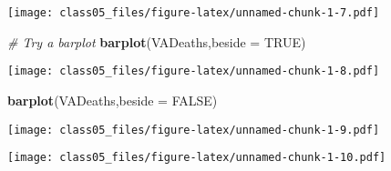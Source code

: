 \documentclass[]{article}
\newenvironment{Shaded}{\begin{snugshade}}{\end{snugshade}}
\newcommand{\KeywordTok}[1]{\textcolor[rgb]{0.13,0.29,0.53}{\textbf{#1}}}
\newcommand{\DataTypeTok}[1]{\textcolor[rgb]{0.13,0.29,0.53}{#1}}
\newcommand{\DecValTok}[1]{\textcolor[rgb]{0.00,0.00,0.81}{#1}}
\newcommand{\FloatTok}[1]{\textcolor[rgb]{0.00,0.00,0.81}{#1}}
\newcommand{\CharTok}[1]{\textcolor[rgb]{0.31,0.60,0.02}{#1}}
\newcommand{\StringTok}[1]{\textcolor[rgb]{0.31,0.60,0.02}{#1}}
\newcommand{\CommentTok}[1]{\textcolor[rgb]{0.56,0.35,0.01}{\textit{#1}}}
\newcommand{\OtherTok}[1]{\textcolor[rgb]{0.56,0.35,0.01}{#1}}
\newcommand{\OperatorTok}[1]{\textcolor[rgb]{0.81,0.36,0.00}{\textbf{#1}}}
\newcommand{\NormalTok}[1]{#1}
\begin{document}
\texttt{[image: class05\_files/figure-latex/unnamed-chunk-1-7.pdf]}

\begin{Shaded}
\begin{Highlighting}[]
\CommentTok{# Try a barplot}
\KeywordTok{barplot}\NormalTok{(VADeaths,}\DataTypeTok{beside =} \OtherTok{TRUE}\NormalTok{)}
\end{Highlighting}
\end{Shaded}

\texttt{[image: class05\_files/figure-latex/unnamed-chunk-1-8.pdf]}

\begin{Shaded}
\begin{Highlighting}[]
\KeywordTok{barplot}\NormalTok{(VADeaths,}\DataTypeTok{beside =} \OtherTok{FALSE}\NormalTok{)}
\end{Highlighting}
\end{Shaded}

\texttt{[image: class05\_files/figure-latex/unnamed-chunk-1-9.pdf]}

\begin{Shaded}
\end{Shaded}

\texttt{[image: class05\_files/figure-latex/unnamed-chunk-1-10.pdf]}
\end{document}
